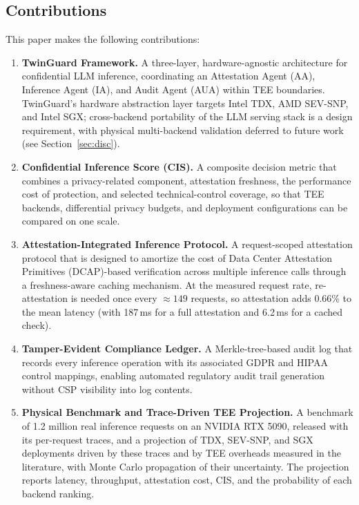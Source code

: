 \documentclass{ieeeaccess}
\begin{document}
\subsection{Contributions}

This paper makes the following contributions:

\begin{enumerate}

\item \textbf{TwinGuard Framework.} A three-layer, hardware-agnostic
architecture for confidential LLM inference, coordinating an Attestation
Agent (AA), Inference Agent (IA), and Audit Agent (AUA) within TEE
boundaries. TwinGuard's hardware abstraction layer targets Intel TDX,
AMD SEV-SNP, and Intel SGX; cross-backend portability of the LLM
serving stack is a design requirement, with physical multi-backend
validation deferred to future work (see Section~\ref{sec:disc}).

\item \textbf{Confidential Inference Score (CIS).} A composite decision
metric that combines a privacy-related component, attestation freshness, the
performance cost of protection, and selected technical-control coverage, so
that TEE backends, differential privacy budgets, and deployment configurations
can be compared on one scale.

\item \textbf{Attestation-Integrated Inference Protocol.} A request-scoped
attestation protocol that is designed to amortize the cost of Data Center Attestation Primitives (DCAP)-based verification across multiple inference calls through a freshness-aware caching
mechanism. At the measured request rate, re-attestation is needed once every
$\approx 149$ requests, so attestation adds 0.66\% to the mean latency (with
187\,ms for a full attestation and 6.2\,ms for a cached check).

\item \textbf{Tamper-Evident Compliance Ledger.} A Merkle-tree-based audit
log that records every inference operation with its associated GDPR and HIPAA
control mappings, enabling automated regulatory audit trail generation without
CSP visibility into log contents.

\item \textbf{Physical Benchmark and Trace-Driven TEE Projection.} A
benchmark of 1.2 million real inference requests on an NVIDIA RTX 5090,
released with its per-request traces, and a projection of TDX, SEV-SNP, and
SGX deployments driven by these traces and by TEE overheads measured in the
literature, with Monte Carlo propagation of their uncertainty. The projection
reports latency, throughput, attestation cost, CIS, and the probability of
each backend ranking.

\end{enumerate}
\end{document}
